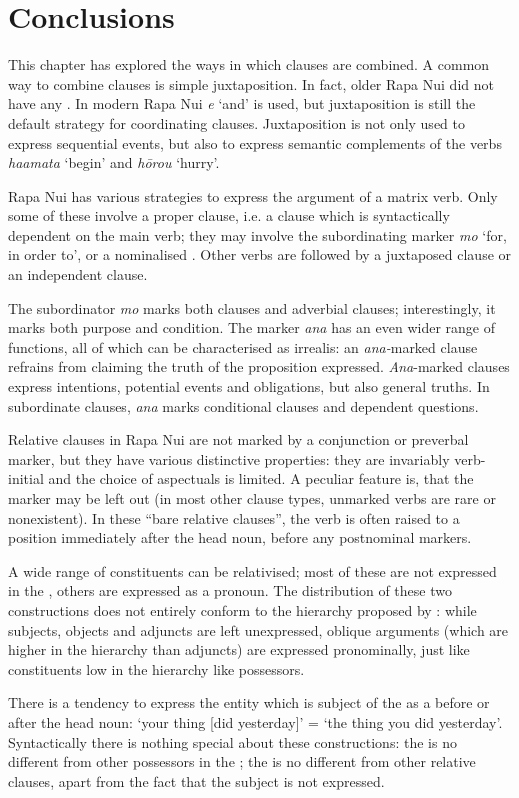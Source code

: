 \section{Conclusions}\label{sec:11.7}

This chapter has explored the ways in which clauses are combined. A common way to combine clauses is simple juxtaposition. In fact, older Rapa Nui did not have any . In modern Rapa Nui \textit{{\ꞌ}e} ‘and’ is used, but juxtaposition is still the default strategy for coordinating clauses. Juxtaposition is not only used to express sequential events, but also to express semantic complements of the verbs \textit{ha{\ꞌ}amata} ‘begin’ and \textit{hōrou} ‘hurry’. 

Rapa Nui has various strategies to express the argument of a matrix verb. Only some of these involve a proper  clause, i.e. a clause which is syntactically dependent on the main verb; they may involve the subordinating marker \textit{mo} ‘for, in order to’, or a nominalised . Other verbs are followed by a juxtaposed clause or an independent clause.

The subordinator \textit{mo} marks both  clauses and adverbial clauses; interestingly, it marks both purpose and condition. The marker \textit{ana} has an even wider range of functions, all of which can be characterised as irrealis: an \textit{ana-}marked clause refrains from claiming the truth of the proposition expressed. \textit{Ana}{}-marked clauses express intentions, potential events and obligations, but also general truths. In subordinate clauses, \textit{ana} marks conditional clauses and dependent questions.

Relative clauses in Rapa Nui are not marked by a conjunction or preverbal marker, but they have various distinctive properties: they are invariably verb-initial and the choice of aspectuals is limited. A peculiar feature is, that the  marker may be left out (in most other clause types, unmarked verbs are rare or nonexistent). In these “bare relative clauses”, the verb is often raised to a position immediately after the head noun, before any postnominal markers.

A wide range of constituents can be relativised; most of these are not expressed in the , others are expressed as a pronoun. The distribution of these two constructions does not entirely conform to the  hierarchy proposed by \citet{KeenanComrie1977}: while subjects, objects and adjuncts are left unexpressed, oblique arguments (which are higher in the hierarchy than adjuncts) are expressed pronominally, just like constituents low in the hierarchy like possessors.

There is a tendency to express the entity which is subject of the  as a  before or after the head noun: ‘your thing [did yesterday]’ = ‘the thing you did yesterday’. Syntactically there is nothing special about these constructions: the  is no different from other possessors in the ; the  is no different from other relative clauses, apart from the fact that the subject is not expressed.

